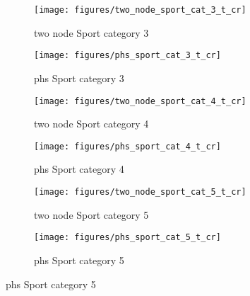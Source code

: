 \documentclass[11pt]{article}
\begin{document}
    \begin{figure}[htb!]
        \centering

        \begin{subfigure}{.5\textwidth}
            \centering
            \texttt{[image: figures/two\_node\_sport\_cat\_3\_t\_cr]}
            \caption{two node Sport category 3}\label{fig:two_node_sport_cat_3_t_cr}
        \end{subfigure}%
        \hfill
        \begin{subfigure}{.5\textwidth}
            \centering
            \texttt{[image: figures/phs\_sport\_cat\_3\_t\_cr]}
            \caption{phs Sport category 3}\label{fig:phs_sport_cat_3_t_cr}
        \end{subfigure}%
        \hfill
        \begin{subfigure}{.5\textwidth}
            \centering
            \texttt{[image: figures/two\_node\_sport\_cat\_4\_t\_cr]}
            \caption{two node Sport category 4}\label{fig:two_node_sport_cat_4_t_cr}
        \end{subfigure}%
        \hfill
        \begin{subfigure}{.5\textwidth}
            \centering
            \texttt{[image: figures/phs\_sport\_cat\_4\_t\_cr]}
            \caption{phs Sport category 4}\label{fig:phs_sport_cat_4_t_cr}
        \end{subfigure}%
        \hfill
        \hfill
        \begin{subfigure}{.5\textwidth}
            \centering
            \texttt{[image: figures/two\_node\_sport\_cat\_5\_t\_cr]}
            \caption{two node Sport category 5}\label{fig:two_node_sport_cat_5_t_cr}
        \end{subfigure}%
        \hfill
        \begin{subfigure}{.5\textwidth}
            \centering
            \texttt{[image: figures/phs\_sport\_cat\_5\_t\_cr]}
            \caption{phs Sport category 5}\label{fig:phs_sport_cat_5_t_cr}
        \end{subfigure}%
        \hfill

    \end{figure}
\end{document}
